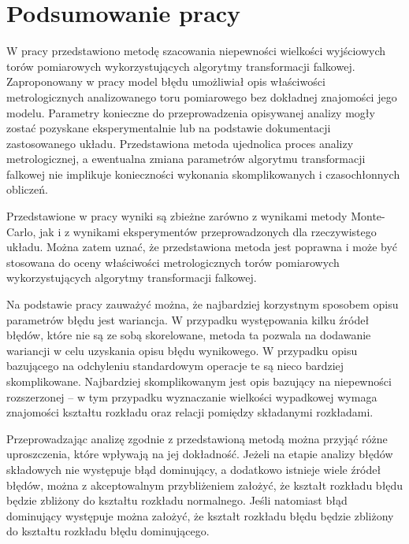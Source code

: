 \chapter{Podsumowanie pracy}

W pracy przedstawiono metodę szacowania niepewności wielkości wyjściowych torów pomiarowych wykorzystujących algorytmy transformacji falkowej. Zaproponowany w pracy model błędu umożliwiał opis właściwości metrologicznych analizowanego toru pomiarowego bez dokładnej znajomości jego modelu. Parametry konieczne do przeprowadzenia opisywanej analizy mogły zostać pozyskane eksperymentalnie lub na podstawie dokumentacji zastosowanego układu. Przedstawiona metoda ujednolica proces analizy metrologicznej, a ewentualna zmiana parametrów algorytmu transformacji falkowej nie implikuje konieczności wykonania skomplikowanych i czasochłonnych obliczeń.

Przedstawione w pracy wyniki są zbieżne zarówno z wynikami metody Monte-Carlo, jak i z wynikami eksperymentów przeprowadzonych dla rzeczywistego układu. Można zatem uznać, że przedstawiona metoda jest poprawna i może być stosowana do oceny właściwości metrologicznych torów pomiarowych wykorzystujących algorytmy transformacji falkowej.

Na podstawie pracy zauważyć można, że najbardziej korzystnym sposobem opisu parametrów błędu jest wariancja. W przypadku występowania kilku źródeł błędów, które nie są ze sobą skorelowane, metoda ta pozwala na dodawanie wariancji w celu uzyskania opisu błędu wynikowego. W przypadku opisu bazującego na odchyleniu standardowym operacje te są nieco bardziej skomplikowane. Najbardziej skomplikowanym jest opis bazujący na niepewności rozszerzonej -- w tym przypadku wyznaczanie wielkości wypadkowej wymaga znajomości kształtu rozkładu oraz relacji pomiędzy składanymi rozkładami.

Przeprowadzając analizę zgodnie z przedstawioną metodą można przyjąć różne uproszczenia, które wpływają na jej dokładność. Jeżeli na etapie analizy błędów składowych nie występuje błąd dominujący, a dodatkowo istnieje wiele źródeł błędów, można z akceptowalnym przybliżeniem założyć, że kształt rozkładu błędu będzie zbliżony do kształtu rozkładu normalnego. Jeśli natomiast błąd dominujący występuje można założyć, że kształt rozkładu błędu będzie zbliżony do kształtu rozkładu błędu dominującego.

